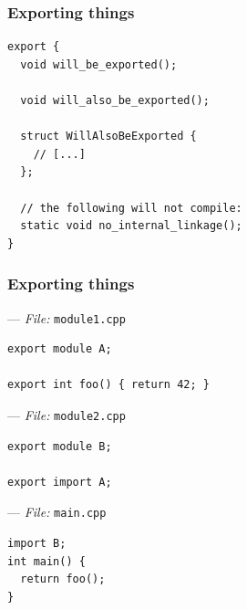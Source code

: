 \documentclass[aspectratio=169]{beamer}
\newif\iftransitions
\newcommand{\cpause}{\iftransitions \pause \fi}
\begin{document}
\begin{frame}[fragile]
  \frametitle{Exporting things}

  \begin{lstlisting}[style=cpp20]
export {
  void will_be_exported();

  void will_also_be_exported();

  struct WillAlsoBeExported {
    // [...]
  };

  // the following will not compile:
  static void no_internal_linkage();
}
  \end{lstlisting}

\end{frame}

\begin{frame}[fragile]
  \frametitle{Exporting things}

  --- \textit{File:} \texttt{module1.cpp}
  \begin{lstlisting}[style=cpp20]
export module A;

export int foo() { return 42; }
  \end{lstlisting}
  --- \textit{File:} \texttt{module2.cpp}
  \begin{lstlisting}[style=cpp20]
export module B;

export import A;
  \end{lstlisting}
  \cpause
  --- \textit{File:} \texttt{main.cpp}
  \begin{lstlisting}[style=cpp20]
import B;
int main() {
  return foo();
}
  \end{lstlisting}

\end{frame}
\end{document}
